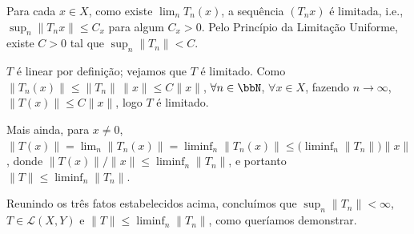 \begin{myproof}
	Para cada $x\in X$, como existe $\lim_n T_n(x)$, a sequência $(T_nx)$ é limitada, i.e.,
	$\sup_n\|T_nx\|\leq C_x$ para algum $C_x>0$. Pelo Princípio da Limitação Uniforme, existe $C>0$ tal
	que $\sup_n\|T_n\|<C$.

	$T$ é linear por definição; vejamos que $T$ é limitado. Como $\|T_n(x)\|\leq\|T_n\|\,\|x\|\leq
	C\|x\|$, $\forall n\in\bbN$, $\forall x\in X$, fazendo $n\to\infty$, $\|T(x)\|\leq C\|x\|$, logo $T$
	é limitado.

	Mais ainda, para $x\neq 0$, $\|T(x)\|=\lim_n\|T_n(x)\|=\liminf_n\|T_n(x)\|\leq\big(\liminf_n
	\|T_n\|\big)\|x\|$, donde $\|T(x)\|/\|x\|\leq\liminf_n\|T_n\|$, e portanto
	$\|T\|\leq\liminf_n\|T_n\|$.

	Reunindo os três fatos estabelecidos acima, concluímos que $\sup_n\|T_n\|<\infty$,
	$T\in\mathcal{L}(X,Y)$ e $\|T\|\leq\liminf_n\|T_n\|$, como queríamos demonstrar.
\end{myproof}


